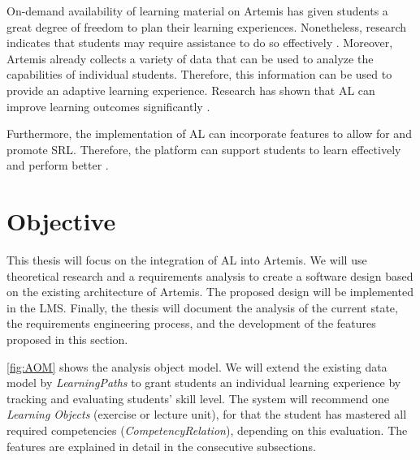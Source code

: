 \documentclass[a4paper,12pt,twoside]{article}
\begin{document}
On-demand availability of learning material on Artemis has given students a great degree of freedom to plan their learning experiences. Nonetheless, research
indicates that students may require assistance to do so effectively \cite{latham1991self}. Moreover, Artemis already collects a variety of data that can be used to analyze
the capabilities of individual students. Therefore, this information can be used to provide an adaptive learning experience. Research has shown that
\ac{AL} can improve learning outcomes significantly \cite{liu2017investigating}.

Furthermore, the implementation of \ac{AL} can incorporate features to allow for and promote \ac{SRL}. Therefore, the platform can support students to learn
effectively and perform better \cite{anthonysamy2020self}.


\section{Objective}

This thesis will focus on the integration of \ac{AL} into Artemis.
We will use theoretical research and a requirements analysis to create a software design based on the existing architecture of Artemis. The proposed
design will be implemented in the \ac{LMS}. Finally, the thesis will document the analysis of the current state, the requirements engineering process,
and the development of the features proposed in this section.

\autoref{fig:AOM} shows the analysis object model. We will extend the existing data model by \textit{LearningPaths} to grant students
an individual learning experience by tracking and evaluating students' skill level. The system will recommend one \textit{Learning Objects}
(exercise or lecture unit), for that the student has mastered all required competencies (\textit{CompetencyRelation}), depending on this evaluation.
The features are explained in detail in the consecutive subsections.
\end{document}
